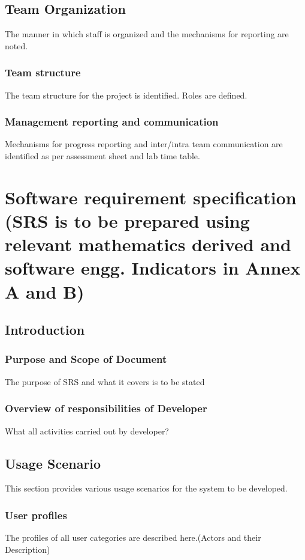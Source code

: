 \documentclass[oneside,a4paper,12pt]{report}
\begin{document}
 
\section{Team Organization}
The manner in which staff is organized and the mechanisms for reporting are noted.  
\subsection{Team structure}
The team structure for the project is identified. Roles are defined.

\subsection{Management reporting and communication}
Mechanisms for progress reporting and inter/intra team communication are identified as per assessment sheet and lab time table. 
 
\chapter{Software requirement specification  (SRS is to be prepared using relevant mathematics derived and software engg. Indicators in Annex A and B)}

\section{Introduction}
\subsection{Purpose and Scope of Document}
The purpose of SRS and what it covers is to be stated 

\subsection{Overview of responsibilities of Developer}
What all activities carried out by developer?
  
\section{Usage Scenario}
This section provides various usage scenarios for the system to be developed.  
 \subsection{User profiles}  
The profiles of all user categories are described here.(Actors and their Description)
\end{document}
